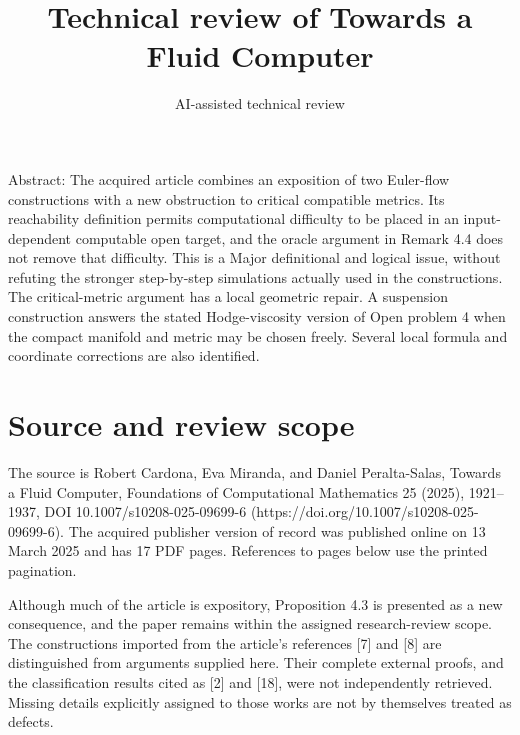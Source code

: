 \documentclass[10pt]{article}
\title{Technical review of
Towards a Fluid Computer}
\author{AI-assisted technical review}
\date{}
\begin{document}
\maketitle
Abstract: The acquired article combines an exposition of two Euler-flow constructions with a new obstruction to critical compatible metrics. Its reachability definition permits computational difficulty to be placed in an input-dependent computable open target, and the oracle argument in Remark 4.4 does not remove that difficulty. This is a Major definitional and logical issue, without refuting the stronger step-by-step simulations actually used in the constructions. The critical-metric argument has a local geometric repair. A suspension construction answers the stated Hodge-viscosity version of Open problem 4 when the compact manifold and metric may be chosen freely. Several local formula and coordinate corrections are also identified.\par
\section*{Source and review scope}
The source is Robert Cardona, Eva Miranda, and Daniel Peralta-Salas, Towards a Fluid Computer, Foundations of Computational Mathematics 25 (2025), 1921–1937, DOI 10.1007/s10208-025-09699-6 (https://doi.org/10.1007/s10208-025-09699-6). The acquired publisher version of record was published online on 13 March 2025 and has 17 PDF pages. References to pages below use the printed pagination.\par
Although much of the article is expository, Proposition 4.3 is presented as a new consequence, and the paper remains within the assigned research-review scope. The constructions imported from the article’s references [7] and [8] are distinguished from arguments supplied here. Their complete external proofs, and the classification results cited as [2] and [18], were not independently retrieved. Missing details explicitly assigned to those works are not by themselves treated as defects.\par
\end{document}

